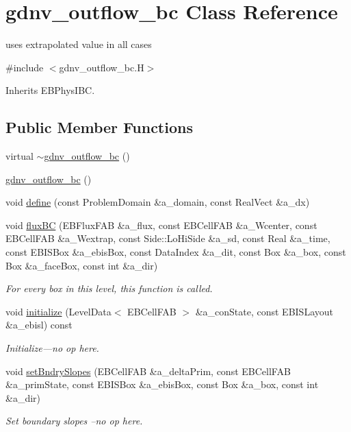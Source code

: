 \hypertarget{classgdnv__outflow__bc}{}\section{gdnv\+\_\+outflow\+\_\+bc Class Reference}
\label{classgdnv__outflow__bc}


uses extrapolated value in all cases  




{\ttfamily \#include $<$gdnv\+\_\+outflow\+\_\+bc.\+H$>$}



Inherits E\+B\+Phys\+I\+BC.

\subsection*{Public Member Functions}
\begin{DoxyCompactItemize}
\item 
virtual \hyperlink{classgdnv__outflow__bc_aa7e3d01ac01aff6e968a2e91e45ccd17}{$\sim$gdnv\+\_\+outflow\+\_\+bc} ()
\item 
\hyperlink{classgdnv__outflow__bc_ade2d077b7cdb57ab4558909f47977d89}{gdnv\+\_\+outflow\+\_\+bc} ()
\item 
void \hyperlink{classgdnv__outflow__bc_aa8a81241c619f4c665679ed7b6481ced}{define} (const Problem\+Domain \&a\+\_\+domain, const Real\+Vect \&a\+\_\+dx)
\item 
void \hyperlink{classgdnv__outflow__bc_ae386b115a952727364438fdec9b31b94}{flux\+BC} (E\+B\+Flux\+F\+AB \&a\+\_\+flux, const E\+B\+Cell\+F\+AB \&a\+\_\+\+Wcenter, const E\+B\+Cell\+F\+AB \&a\+\_\+\+Wextrap, const Side\+::\+Lo\+Hi\+Side \&a\+\_\+sd, const Real \&a\+\_\+time, const E\+B\+I\+S\+Box \&a\+\_\+ebis\+Box, const Data\+Index \&a\+\_\+dit, const Box \&a\+\_\+box, const Box \&a\+\_\+face\+Box, const int \&a\+\_\+dir)
\begin{DoxyCompactList}\small\item\em For every box in this level, this function is called. \end{DoxyCompactList}\item 
void \hyperlink{classgdnv__outflow__bc_a5077b85a62d820be2242953df38ae108}{initialize} (Level\+Data$<$ E\+B\+Cell\+F\+AB $>$ \&a\+\_\+con\+State, const E\+B\+I\+S\+Layout \&a\+\_\+ebisl) const 
\begin{DoxyCompactList}\small\item\em Initialize---no op here. \end{DoxyCompactList}\item 
void \hyperlink{classgdnv__outflow__bc_adfa0279d728aea3e8b5e31f112d461a8}{set\+Bndry\+Slopes} (E\+B\+Cell\+F\+AB \&a\+\_\+delta\+Prim, const E\+B\+Cell\+F\+AB \&a\+\_\+prim\+State, const E\+B\+I\+S\+Box \&a\+\_\+ebis\+Box, const Box \&a\+\_\+box, const int \&a\+\_\+dir)
\begin{DoxyCompactList}\small\item\em Set boundary slopes --no op here. \end{DoxyCompactList}\end{DoxyCompactItemize}
